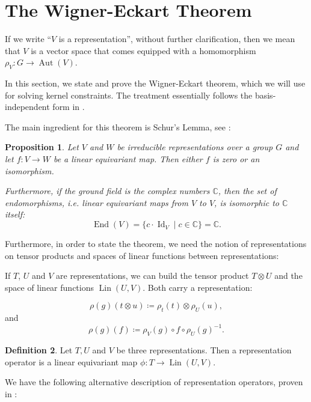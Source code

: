 \documentclass[12pt, a4paper]{article}
\theoremstyle{plain}
\newtheorem{pro}{Proposition}[section]
\theoremstyle{definition}
\newtheorem{dfn}[pro]{Definition}
\theoremstyle{remark}
\newcommand{\C}{\mathds{C}}
\DeclareMathOperator{\lin}{Lin}
\DeclareMathOperator{\aut}{Aut}
\DeclareMathOperator{\End}{End}
\DeclareMathOperator{\Id}{Id}
\begin{document}
\section{The Wigner-Eckart Theorem}

If we write ``$V$ is a representation'', without further clarification, then we mean that $V$ is a vector space that comes equipped with a homomorphism $\rho_V: G \to \aut (V)$.

In this section, we state and prove the Wigner-Eckart theorem, which we will use for solving kernel constraints. The treatment essentially follows the basis-independent form in \cite{wigner-eckart}.

The main ingredient for this theorem is Schur's Lemma, see \cite{Jeevanjee}:

\begin{pro}\label{Schur}
Let $V$ and $W$ be irreducible representations over a group $G$ and let $f: V \to W$ be a linear equivariant map. Then either $f$ is zero or an isomorphism.

Furthermore, if the ground field is the complex numbers $\C$, then the set of endomorphisms, i.e. linear equivariant maps from $V$ to $V$, is isomorphic to $\C$ itself:
\begin{equation*}
\End(V) = \{c \cdot \Id_V \mid c \in \C\} = \C.
\end{equation*}
\end{pro}

Furthermore, in order to state the theorem, we need the notion of representations on tensor products and spaces of linear functions between representations:

If $T$, $U$ and $V$ are representations, we can build the tensor product $T \otimes U$ and the space of linear functions $\lin(U, V)$. Both carry a representation:

\begin{equation*}
\rho(g)(t \otimes u) \coloneqq \rho_t(t) \otimes \rho_U(u),
\end{equation*}
and
\begin{equation*}
\rho(g)(f) \coloneq \rho_V(g) \circ f \circ \rho_U(g)^{-1}.
\end{equation*}

\begin{dfn}
Let $T, U$ and $V$ be three representations. Then a representation operator is a linear equivariant map $\phi: T \to \lin(U, V)$.
\end{dfn}

We have the following alternative description of representation operators, proven in \cite{wigner-eckart}:
\end{document}
